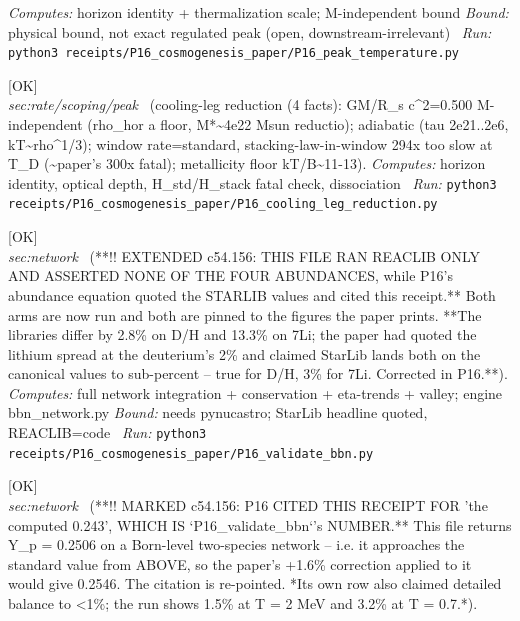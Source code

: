 \begin{description}
\emph{Computes:} horizon identity + thermalization scale; M-independent bound
 \emph{Bound:} physical bound, not exact regulated peak (open, downstream-irrelevant)
\ \emph{Run:} \texttt{python3 receipts/P16\_cosmogenesis\_paper/P16\_peak\_temperature.py}
\item[\rcptlabel{P16_cooling_leg_reduction}{P16R9}\textbf{P16R9}\quad\texttt{P16\_cooling\_leg\_reduction}]\hfill\textsf{[OK]}\\
\textit{sec:rate/scoping/peak} \ (cooling-leg reduction (4 facts): GM/R\_s c\textasciicircum{}2=0.500 M-independent (rho\_hor a floor, M*\textasciitilde{}4e22 Msun reductio); adiabatic (tau 2e21..2e6, kT\textasciitilde{}rho\textasciicircum{}1/3); window rate=standard, stacking-law-in-window 294x too slow at T\_D (\textasciitilde{}paper's 300x fatal); metallicity floor kT/B\textasciitilde{}11-13). 
\emph{Computes:} horizon identity, optical depth, H\_std/H\_stack fatal check, dissociation
\ \emph{Run:} \texttt{python3 receipts/P16\_cosmogenesis\_paper/P16\_cooling\_leg\_reduction.py}
\item[\rcptlabel{P16_validate_bbn}{P16R10}\textbf{P16R10}\quad\texttt{P16\_validate\_bbn}]\hfill\textsf{[OK]}\\
\textit{sec:network} \ (**!! EXTENDED c54.156: THIS FILE RAN REACLIB ONLY AND ASSERTED NONE OF THE FOUR ABUNDANCES, while P16's abundance equation quoted the STARLIB values and cited this receipt.** Both arms are now run and both are pinned to the figures the paper prints. **The libraries differ by 2.8\% on D/H and 13.3\% on 7Li; the paper had quoted the lithium spread at the deuterium's 2\% and claimed StarLib lands both on the canonical values to sub-percent -- true for D/H, 3\% for 7Li. Corrected in P16.**). 
\emph{Computes:} full network integration + conservation + eta-trends + valley; engine bbn\_network.py
 \emph{Bound:} needs pynucastro; StarLib headline quoted, REACLIB=code
\ \emph{Run:} \texttt{python3 receipts/P16\_cosmogenesis\_paper/P16\_validate\_bbn.py}
\item[\rcptlabel{P16_Yp_freezeout}{P16R11}\textbf{P16R11}\quad\texttt{P16\_Yp\_freezeout}]\hfill\textsf{[OK]}\\
\textit{sec:network} \ (**!! MARKED c54.156: P16 CITED THIS RECEIPT FOR 'the computed 0.243', WHICH IS `P16\_validate\_bbn`'s NUMBER.** This file returns Y\_p = 0.2506 on a Born-level two-species network -- i.e. it approaches the standard value from ABOVE, so the paper's +1.6\% correction applied to it would give 0.2546. The citation is re-pointed. *Its own row also claimed detailed balance to <1\%; the run shows 1.5\% at T = 2 MeV and 3.2\% at T = 0.7.*). 

\end{description}
